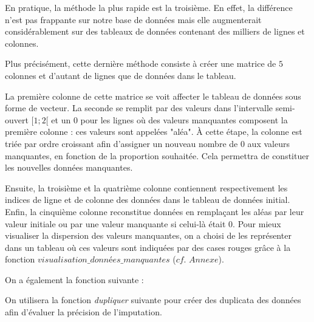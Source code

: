 \documentclass[12pt, openany, fleqn, french]{article}
\begin{document}
\begin{algorithm}[H]
\end{algorithm}

    \vspace{0,5cm}
    En pratique, la méthode la plus rapide est la troisième. En effet, la différence n'est pas frappante sur notre base de données mais elle augmenterait considérablement sur des tableaux de données contenant des milliers de lignes et colonnes. 

    Plus précisément, cette dernière méthode consiste à créer une matrice de $5$ colonnes et d'autant de lignes que de données dans le tableau. 
    
    La première colonne de cette matrice se voit affecter le tableau de données sous forme de vecteur. La seconde se remplit par des valeurs dans l'intervalle semi-ouvert $[1;2[$ et un $0$ pour les lignes où des valeurs manquantes composent la première colonne : ces valeurs sont appelées "aléa". À cette étape, la colonne est triée par ordre croissant afin d'assigner un nouveau nombre de $0$ aux valeurs manquantes, en fonction de la proportion souhaitée. Cela permettra de constituer les nouvelles données manquantes. 
    
    Ensuite, la troisième et la quatrième colonne contiennent respectivement les indices de ligne et de colonne des données dans le tableau de données initial. Enfin, la cinquième colonne reconstitue données en remplaçant les aléas par leur valeur initiale ou par une valeur manquante si celui-là était $0$.
    Pour mieux visualiser la dispersion des valeurs manquantes, on a choisi de les représenter dans un tableau où ces valeurs sont indiquées par des cases rouges grâce à la fonction 
    $\textit{visualisation\_données\_manquantes}$ ($\textit{cf. Annexe}$).


    On a également la fonction suivante :

\hspace{1cm}

\begin{algorithm}[H]
\footnotesize
     {($donn\acute{e}es$)}
    \State données \gets (donnes - moyenne) / cart \, type} \\
    \State \Return données\\
    \EndFunction
\end{algorithm}

    \vspace{0,5cm}
    On utilisera la fonction \textit{dupliquer} suivante pour créer des duplicata des données afin d'évaluer la précision de l'imputation. 
    \vspace{0,5cm}
\end{document}
